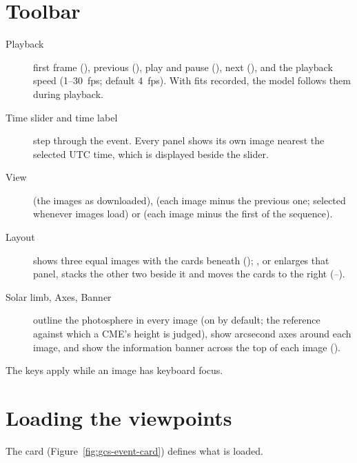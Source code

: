 \section{Toolbar}
\label{sec:gcs-toolbar}

\begin{description}
  \item[Playback] first frame (), previous (), play and pause (),
    next (), and the playback speed (1--30~fps; default 4~fps). With fits recorded, the
    model follows them during playback.
  \item[Time slider and time label] step through the event. Every panel shows its own image
    nearest the selected UTC time, which is displayed beside the slider.
  \item[View]  (the images as downloaded),  (each image minus the
    previous one; selected whenever images load) or  (each image minus the first
    of the sequence).
  \item[Layout]  shows three equal images with the cards beneath ();
    ,  or  enlarges that panel, stacks the other two beside it and moves
    the cards to the right (--).
  \item[Solar limb, Axes, Banner] outline the photosphere in every image (on by default; the
    reference against which a CME's height is judged), show arcsecond axes around each image,
    and show the information banner across the top of each image ().
\end{description}
The keys apply while an image has keyboard focus.

\section{Loading the viewpoints}
\label{sec:gcs-event-card}

The  card (Figure~\ref{fig:gcs-event-card}) defines what is
loaded.


